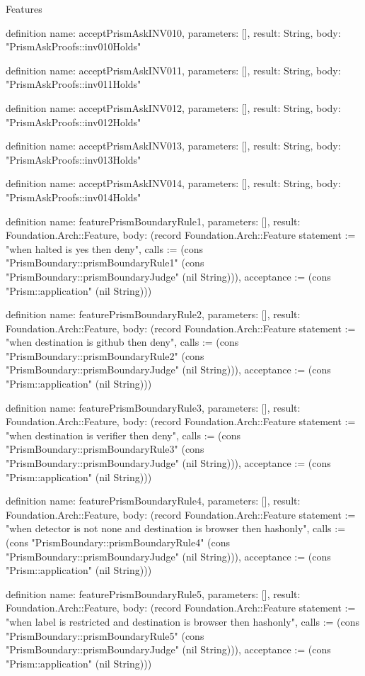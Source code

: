 \begin{lexlean}{Features}
\begin{semanticmodule}
definition{
  name: acceptPrismAskINV010,
  parameters: [],
  result: String,
  body: "PrismAskProofs::inv010Holds"
}

definition{
  name: acceptPrismAskINV011,
  parameters: [],
  result: String,
  body: "PrismAskProofs::inv011Holds"
}

definition{
  name: acceptPrismAskINV012,
  parameters: [],
  result: String,
  body: "PrismAskProofs::inv012Holds"
}

definition{
  name: acceptPrismAskINV013,
  parameters: [],
  result: String,
  body: "PrismAskProofs::inv013Holds"
}

definition{
  name: acceptPrismAskINV014,
  parameters: [],
  result: String,
  body: "PrismAskProofs::inv014Holds"
}

definition{
  name: featurePrismBoundaryRule1,
  parameters: [],
  result: Foundation.Arch::Feature,
  body: (record Foundation.Arch::Feature {statement := "when halted is yes then deny", calls := (cons "PrismBoundary::prismBoundaryRule1" (cons "PrismBoundary::prismBoundaryJudge" (nil String))), acceptance := (cons "Prism::application" (nil String))})
}

definition{
  name: featurePrismBoundaryRule2,
  parameters: [],
  result: Foundation.Arch::Feature,
  body: (record Foundation.Arch::Feature {statement := "when destination is github then deny", calls := (cons "PrismBoundary::prismBoundaryRule2" (cons "PrismBoundary::prismBoundaryJudge" (nil String))), acceptance := (cons "Prism::application" (nil String))})
}

definition{
  name: featurePrismBoundaryRule3,
  parameters: [],
  result: Foundation.Arch::Feature,
  body: (record Foundation.Arch::Feature {statement := "when destination is verifier then deny", calls := (cons "PrismBoundary::prismBoundaryRule3" (cons "PrismBoundary::prismBoundaryJudge" (nil String))), acceptance := (cons "Prism::application" (nil String))})
}

definition{
  name: featurePrismBoundaryRule4,
  parameters: [],
  result: Foundation.Arch::Feature,
  body: (record Foundation.Arch::Feature {statement := "when detector is not none and destination is browser then hashonly", calls := (cons "PrismBoundary::prismBoundaryRule4" (cons "PrismBoundary::prismBoundaryJudge" (nil String))), acceptance := (cons "Prism::application" (nil String))})
}

definition{
  name: featurePrismBoundaryRule5,
  parameters: [],
  result: Foundation.Arch::Feature,
  body: (record Foundation.Arch::Feature {statement := "when label is restricted and destination is browser then hashonly", calls := (cons "PrismBoundary::prismBoundaryRule5" (cons "PrismBoundary::prismBoundaryJudge" (nil String))), acceptance := (cons "Prism::application" (nil String))})
}


\end{semanticmodule}
\end{lexlean}
